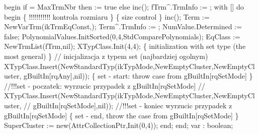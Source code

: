 begin
   if  = MaxTrmNbr then
       := true
   else inc();
   fTrm^.TrmInfo := ;
   with [] do
   begin
      \{ !!!!!!!!!!! kontrola rozmiaru \} \{ size control \}
      inc();
      Term := NewVarTrm(ikTrmEqConst,);
      Term^.TrmInfo := ;
      NumValue.Determined := false;
      PolynomialValues.InitSorted(0,4,StdComparePolynomials);
      EqClass := NewTrmList(fTrm,nil);
      XTypClass.Init(4,4);
      \{ initialization with set type (the most general) \} 
      //  inicjalizacja z typem set (najbardziej ogolnym)
      XTypClass.Insert(NewStandardTyp(ikTypMode,NewEmptyCluster,NewEmptyCluster,
                                      gBuiltIn[rqAny],nil));
      \{ set - start: throw case from gBuiltIn[rqSetMode] \}
      //!!!set - poczatek: wyrzucic przypadek z gBuiltIn[rqSetMode]
      //   XTypClass.Insert(NewStandardTyp(ikTypMode,NewEmptyCluster,NewEmptyCluster,
      //                             gBuiltIn[rqSetMode],nil));
      //!!!set - koniec wyrzucic przypadek z gBuiltIn[rqSetMode]
      \{ set - end, throw the case from gBuiltIn[rqSetMode] \}
      SuperCluster := new(AttrCollectionPtr,Init(0,4));
   end;
end;
\eatline
{}\nwendcode{}\nwdocspar
\nwenddocs{}\endmoddef\nwstartdeflinemarkup{}\nwenddeflinemarkup
var : boolean;

